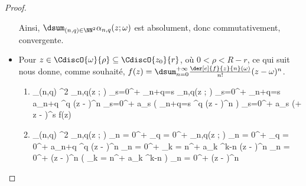 \begin{proof}
\begin{itemize}
		\noindent
		Ainsi,
		$\dsum_{(n,q) \in \NN^2} \alpha_{n,q}(z ; \omega)$
		est absolument, donc commutativement, convergente.
	

		\item Pour $z \in \CdiscO{\omega}{\rho} \subseteq \CdiscO{z_0}{r}$, où $0 < \rho < R - r$, ce qui suit nous donne, comme souhaité,
		$f(z) = \dsum_{n = 0}^{+\infty} \frac{\der[e]{f}{z}{n}(\omega)}{n!} (z - \omega)^n$.

        \begin{multicols}{2}
        	\setlength{\columnseprule}{.75pt}
	        \begin{enumerate}[wide]
    			\item
        		\begin{stepcalc}[style=ar*]
        			\dsum_{(n,q) \in \NN^2} \alpha_{n,q}(z ; \omega)
        		\explnext{}
        			\dsum_{s=0}^{+\infty} \dsum_{n+q=s} \alpha_{n,q}(z ; \omega)
        		\explnext{}
        			\dsum_{s=0}^{+\infty} \dsum_{n+q=s}  a_{n+q} \omega^q (z - \omega)^n
        		\explnext{}
        			\dsum_{s=0}^{+\infty} a_s \big( \dsum_{n+q=s}  \omega^q (z - \omega)^n \big)
        		\explnext{}
        			\dsum_{s=0}^{+\infty} a_s (\omega + z - \omega)^s
        		\explnext{}
        			f(z)
        		\end{stepcalc}


    			\item
        		\begin{stepcalc}[style=ar*]
        			\dsum_{(n,q) \in \NN^2} \alpha_{n,q}(z ; \omega)
        		\explnext{}
        			\dsum_{n = 0}^{+\infty} \dsum_{q = 0}^{+\infty} \alpha_{n,q}(z ; \omega)
        		\explnext{}
        			\dsum_{n = 0}^{+\infty} \dsum_{q = 0}^{+\infty}  a_{n+q} \omega^q (z - \omega)^n
        		\explnext{}
        			\dsum_{n = 0}^{+\infty} \dsum_{k = n}^{+\infty}  a_{k} \omega^{k-n} (z - \omega)^n
        		\explnext{}
        			\dsum_{n = 0}^{+\infty}  (z - \omega)^n \big( \dsum_{k = n}^{+\infty}  a_{k} \omega^{k-n} \big) 
        		\explnext{}
        			\dsum_{n = 0}^{+\infty}  (z - \omega)^n
        		\end{stepcalc}
    		\end{enumerate}
	\end{multicols}
	\end{itemize}

	\null\vspace{-8ex}
\end{proof}


